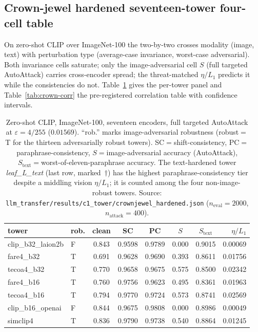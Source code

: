 \subsection{Crown-jewel hardened seventeen-tower four-cell table}\label{app:crown-full}
On zero-shot CLIP over ImageNet-100 the two-by-two crosses modality (image, text)
with perturbation type (average-case invariance, worst-case adversarial). Both
invariance cells saturate; only the image-adversarial cell $S$ (full targeted
AutoAttack) carries cross-encoder spread; the threat-matched $\eta/L_1$ predicts
it while the consistencies do not. Table~\ref{tab:crown-full} gives the per-tower
panel and Table~\ref{tab:crown-corr} the pre-registered correlation table with
confidence intervals.

\begin{table}[t]\centering
\caption{Zero-shot CLIP, ImageNet-100, seventeen encoders, full targeted
AutoAttack at $\varepsilon{=}4/255$ ($0.01569$). ``rob.'' marks image-adversarial
robustness (robust$=$T for the thirteen adversarially robust towers).
SC${=}$shift-consistency, PC${=}$paraphrase-consistency, $S{=}$image-adversarial
accuracy (AutoAttack), $S_{\text{text}}{=}$worst-of-eleven-paraphrase accuracy.
The text-hardened tower \emph{leaf\_L\_text} (last row, marked~$\dagger$) has the
highest paraphrase-consistency tier despite a middling vision $\eta/L_1$; it is
counted among the four non-image-robust towers. Source:
\texttt{llm\_transfer/results/c1\_tower/crownjewel\_hardened.json}
($n_{\text{eval}}{=}2000$, $n_{\text{attack}}{=}400$).}
\label{tab:crown-full}
\scriptsize
\begin{tabular}{llccccc r}
\toprule
tower & rob. & clean & SC & PC & $S$ & $S_{\text{text}}$ & $\eta/L_1$ \\
\midrule
clip\_b32\_laion2b & F & 0.843 & 0.9598 & 0.9789 & 0.000 & 0.9015 & 0.00069 \\
fare4\_b32        & T & 0.691 & 0.9628 & 0.9690 & 0.393 & 0.8611 & 0.01756 \\
tecoa4\_b32       & T & 0.770 & 0.9658 & 0.9675 & 0.575 & 0.8500 & 0.02342 \\
fare4\_b16        & T & 0.760 & 0.9756 & 0.9623 & 0.495 & 0.8361 & 0.01963 \\
tecoa4\_b16       & T & 0.794 & 0.9770 & 0.9724 & 0.573 & 0.8741 & 0.02569 \\
clip\_b16\_openai & F & 0.844 & 0.9675 & 0.9808 & 0.000 & 0.8986 & 0.00049 \\
simclip4          & T & 0.836 & 0.9790 & 0.9738 & 0.540 & 0.8864 & 0.01245 \\

\end{tabular}
\end{table}
